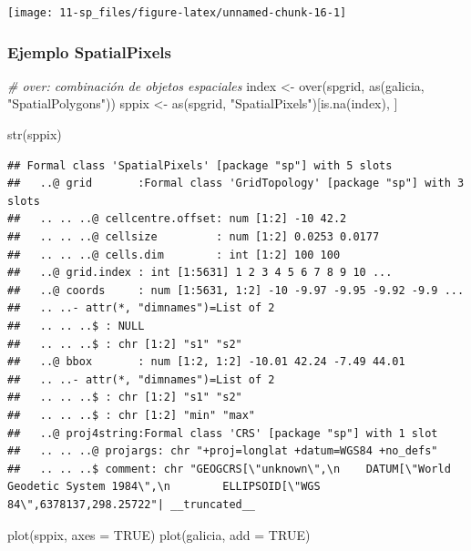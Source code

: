 \documentclass[
  spanish,
]{book}
\newenvironment{Shaded}{\begin{snugshade}}{\end{snugshade}}
\newcommand{\AttributeTok}[1]{\textcolor[rgb]{0.77,0.63,0.00}{#1}}
\newcommand{\CommentTok}[1]{\textcolor[rgb]{0.56,0.35,0.01}{\textit{#1}}}
\newcommand{\ConstantTok}[1]{\textcolor[rgb]{0.00,0.00,0.00}{#1}}
\newcommand{\FunctionTok}[1]{\textcolor[rgb]{0.00,0.00,0.00}{#1}}
\newcommand{\NormalTok}[1]{#1}
\newcommand{\OtherTok}[1]{\textcolor[rgb]{0.56,0.35,0.01}{#1}}
\newcommand{\StringTok}[1]{\textcolor[rgb]{0.31,0.60,0.02}{#1}}
\theoremstyle{break}
\theoremstyle{definition}
\theoremstyle{definition}
\theoremstyle{definition}
\theoremstyle{definition}
\theoremstyle{remark}
\begin{document}
\begin{center}\texttt{[image: 11-sp\_files/figure-latex/unnamed-chunk-16-1]} \end{center}

\hypertarget{ejemplo-spatialpixels}{%
\subsubsection{Ejemplo SpatialPixels}\label{ejemplo-spatialpixels}}

\begin{Shaded}
\begin{Highlighting}[]
\CommentTok{\# over: combinación de objetos espaciales}
\NormalTok{index }\OtherTok{\textless{}{-}} \FunctionTok{over}\NormalTok{(spgrid, }\FunctionTok{as}\NormalTok{(galicia, }\StringTok{"SpatialPolygons"}\NormalTok{))}
\NormalTok{sppix }\OtherTok{\textless{}{-}} \FunctionTok{as}\NormalTok{(spgrid, }\StringTok{"SpatialPixels"}\NormalTok{)[}\FunctionTok{is.na}\NormalTok{(index), ]}

\FunctionTok{str}\NormalTok{(sppix)}
\end{Highlighting}
\end{Shaded}

\begin{verbatim}
## Formal class 'SpatialPixels' [package "sp"] with 5 slots
##   ..@ grid       :Formal class 'GridTopology' [package "sp"] with 3 slots
##   .. .. ..@ cellcentre.offset: num [1:2] -10 42.2
##   .. .. ..@ cellsize         : num [1:2] 0.0253 0.0177
##   .. .. ..@ cells.dim        : int [1:2] 100 100
##   ..@ grid.index : int [1:5631] 1 2 3 4 5 6 7 8 9 10 ...
##   ..@ coords     : num [1:5631, 1:2] -10 -9.97 -9.95 -9.92 -9.9 ...
##   .. ..- attr(*, "dimnames")=List of 2
##   .. .. ..$ : NULL
##   .. .. ..$ : chr [1:2] "s1" "s2"
##   ..@ bbox       : num [1:2, 1:2] -10.01 42.24 -7.49 44.01
##   .. ..- attr(*, "dimnames")=List of 2
##   .. .. ..$ : chr [1:2] "s1" "s2"
##   .. .. ..$ : chr [1:2] "min" "max"
##   ..@ proj4string:Formal class 'CRS' [package "sp"] with 1 slot
##   .. .. ..@ projargs: chr "+proj=longlat +datum=WGS84 +no_defs"
##   .. .. ..$ comment: chr "GEOGCRS[\"unknown\",\n    DATUM[\"World Geodetic System 1984\",\n        ELLIPSOID[\"WGS 84\",6378137,298.25722"| __truncated__
\end{verbatim}

\begin{Shaded}
\begin{Highlighting}[]
\FunctionTok{plot}\NormalTok{(sppix, }\AttributeTok{axes =} \ConstantTok{TRUE}\NormalTok{)}
\FunctionTok{plot}\NormalTok{(galicia, }\AttributeTok{add =} \ConstantTok{TRUE}\NormalTok{)}
\end{Highlighting}
\end{Shaded}
\end{document}
